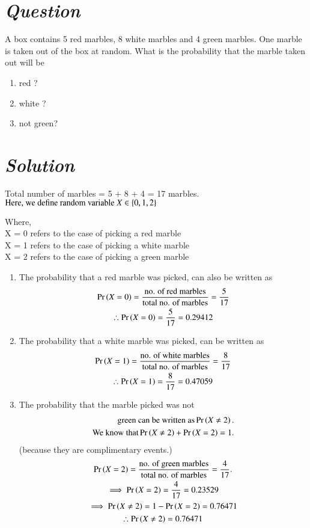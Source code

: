 \documentclass[journal,12pt,twocolumn]{IEEEtran}
\begin{document}
\section*{\emph{Question}}
A box contains 5 red marbles, 8 white marbles and 4 green marbles. One marble is taken out of the box at random. What is the probability that the marble taken out will be
\begin{enumerate}
    \item red ?
    \item white ?
    \item not green?
\end{enumerate} 
\section*{\emph{Solution}}
Total number of marbles = 5 + 8 + 4 = 17 marbles. 
\begin{math}
\\\text{Here, we define random variable }X \in  \left\{0, 1, 2\right\}
\end{math}

Where,
\\X = 0 refers to the case of picking a red marble
\\X = 1 refers to the case of picking a white marble
\\X = 2 refers to the case of picking a green marble
   
\begin{enumerate}
    \item The probability that a red marble was picked, can also be written as 
    \begin{multline}
        \Pr\left(X=0\right) = \frac{\text{no. of red marbles}}{\text{total no. of marbles}} = \frac{5}{17}
        \\\therefore  \Pr\left(X=0\right) = \frac{5}{17} = 0.29412
    \end{multline}
    \item The probability that a white marble was picked, can be written as 
    \begin{multline}
        \Pr\left(X=1\right) = \frac{\text{no. of white marbles}}{\text{total no. of marbles}}
        = \frac{8}{17} 
        \\\therefore  \Pr\left(X=1\right) = \frac{8}{17} = 0.47059
    \end{multline}
    \item The probability that the marble picked was not 
    \begin{align}
    \text{green can be written as} \Pr\left(X \ne 2\right).
    \\\text{We know that} \Pr\left(X \ne 2\right) + \Pr\left(X = 2\right) = 1. 
    \end{align}
     (because they are complimentary events.)
    \begin{multline}
     \Pr\left(X=2\right) = \frac{\text{no. of green marbles}}{\text{total no. of marbles}}
     = \frac{4}{17}.
     \\\implies\Pr\left(X=2\right) = \frac{4}{17} = 0.23529
     \\\implies\Pr\left(X \ne 2\right) = 1 - \Pr\left(X=2\right) = 0.76471
     \\\therefore \Pr\left(X\ne2\right) = 0.76471
    \end{multline}
\end{enumerate}
\end{document}
